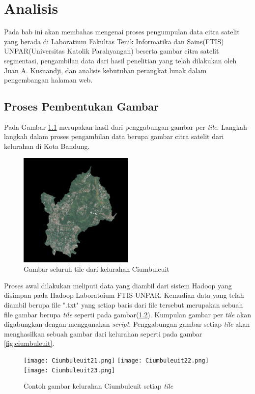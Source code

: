 \chapter{Analisis}
\label{chap:analisis}
Pada bab ini akan membahas mengenai proses pengumpulan data citra satelit yang berada di Laboratium Fakultas Tenik Informatika dan Sains(FTIS) UNPAR(Universitas Katolik Parahyangan) beserta gambar citra satelit segmentasi, pengambilan data dari hasil penelitian yang telah dilakukan oleh Juan A. Kusnandji, dan analisis kebutuhan perangkat lunak dalam pengembangan halaman web.

\section{Proses Pembentukan Gambar}
Pada Gambar \ref{fig:ciumbuleuit3} merupakan hasil dari penggabungan gambar per \textit{tile}. Langkah-langkah dalam proses pengambilan data berupa gambar citra satelit dari kelurahan di Kota Bandung. 
\begin{figure}[H]
	\centering
	\includegraphics[width=0.5\textwidth]{Gambar/Ciumbuleuit.png}
	\caption{Gambar seluruh tile dari kelurahan Ciumbuleuit}
	\label{fig:ciumbuleuit3}
\end{figure} 

Proses awal dilakukan meliputi data yang diambil dari sistem Hadoop yang disimpan pada Hadoop Laboratoium FTIS UNPAR. Kemudian data yang telah diambil berupa file ".txt" yang setiap baris dari file tersebut merupakan sebuah file gambar berupa \textit{tile} seperti pada gambar(\ref{fig:tileCiumbuleuit}). Kumpulan gambar per \textit{tile} akan digabungkan dengan menggunakan \textit{script}. Penggabungan gambar setiap \textit{tile} akan menghasilkan sebuah gambar dari kelurahan seperti pada gambar \ref{fig:ciumbuleuit}.
\begin{figure}[H]
	\centering
	\texttt{[image: Ciumbuleuit21.png]}
	\texttt{[image: Ciumbuleuit22.png]}
	\texttt{[image: Ciumbuleuit23.png]}
	\caption{Contoh gambar kelurahan Ciumbuleuit setiap \textit{tile}}
	\label{fig:tileCiumbuleuit}
\end{figure}

